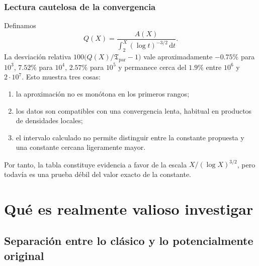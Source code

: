 \documentclass[11pt,a4paper,openany]{report}
\newcommand{\dd}{\,\mathrm{d}}
\begin{document}
\subsection*{Lectura cautelosa de la convergencia}
Definamos
\[
 Q(X)=\frac{A(X)}{\displaystyle\int_2^X(\log t)^{-3/2}\dd t}.
\]
La desviación relativa \(100\bigl(Q(X)/\mathfrak T_{\mathrm{par}}-1\bigr)\) vale aproximadamente \(-0.75\%\) para \(10^3\), \(7.52\%\) para \(10^4\), \(2.57\%\) para \(10^5\) y permanece cerca del \(1.9\%\) entre \(10^6\) y \(2\cdot10^7\). Esto muestra tres cosas:
\begin{enumerate}
\item la aproximación no es monótona en los primeros rangos;
\item los datos son compatibles con una convergencia lenta, habitual en productos de densidades locales;
\item el intervalo calculado no permite distinguir entre la constante propuesta y una constante cercana ligeramente mayor.
\end{enumerate}
Por tanto, la tabla constituye evidencia a favor de la escala \(X/(\log X)^{3/2}\), pero todavía es una prueba débil del valor exacto de la constante.

\chapter{Qué es realmente valioso investigar}

\section{Separación entre lo clásico y lo potencialmente original}
\end{document}
